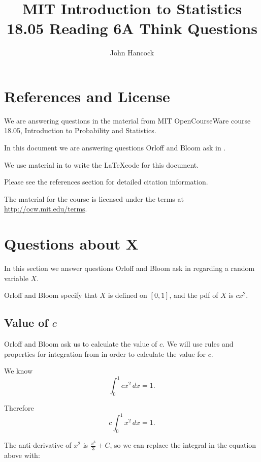 \documentclass[a4paper,11pt]{article}
\author{John Hancock}
\title{MIT Introduction to Statistics 18.05 Reading 6A Think Questions }
\begin{document}
\maketitle
\tableofcontents
\section{References and License}
We are answering questions in the material from MIT OpenCourseWare
course 18.05, Introduction to Probability and Statistics.

In this document we are answering questions Orloff and Bloom ask in
\cite{slides6}.

We use material in \cite{cubeRoot}
to write the \LaTeX code for this
document.

Please see the references section for detailed citation information.

The material for the course is licensed under the terms at
\url{http://ocw.mit.edu/terms}.



\section{Questions about X}

In this section we answer questions Orloff and Bloom ask in \cite{reading6a}
regarding a random variable $X$.

Orloff and Bloom specify that $X$ is defined on $\left[ 0, 1 \right]$, and
the pdf of $X$ is $cx^2$.

\subsection{Value of $c$}

Orloff and Bloom ask us to calculate the value of $c$.  We will use rules
and properties for integration from \cite{basicInt} in order to calculate
the value for $c$.

We know
\begin{equation}
  \int_0^1 cx^2 \, dx = 1.
\end{equation}

Therefore
\begin{equation}
  c \int_0^1 x^2 \, dx = 1.
\end{equation}

The anti-derivative of $x^2$ is $\frac{x^3}{3} +C$, so we can replace the
integral in the equation above with:
\end{document}
